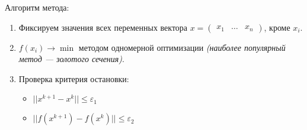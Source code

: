 Алгоритм метода:
\begin{enumerate}
    \item Фиксируем значения всех переменных вектора \(x = \begin{pmatrix} x_1 & \dots & x_n \end{pmatrix} \), кроме \(x_i\).
    \item \(f(x_i) \to \min\) методом одномерной оптимизации \textit{(наиболее популярный метод --- золотого сечения)}.
    \item Проверка критерия остановки:
        \begin{itemize}
            \item \(||x^{k + 1} - x^k|| \leq \varepsilon_1\)
            \item \(||f(x^{k + 1}) - f(x^k)|| \leq \varepsilon_2\)
        \end{itemize}
\end{enumerate}


